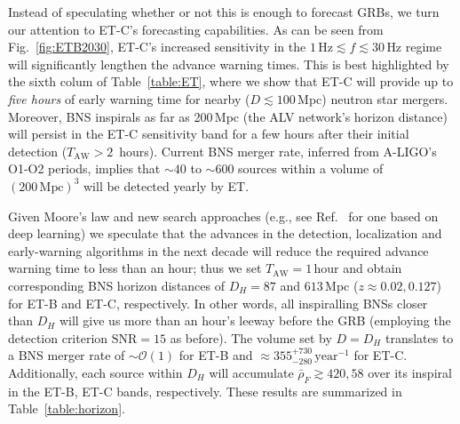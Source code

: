 \documentclass[prd,amsmath,amssymb,aps,floats,amsfonts,notitlepage,superscriptaddress,eqsecnum,nofootinbib,10pt]{revtex4-1}
\begin{document}
Instead of speculating whether or not this is enough to forecast GRBs, we turn our attention to ET-C's forecasting capabilities.
As can be seen from Fig.~\ref{fig:ETB2030}, ET-C's increased sensitivity in the $1\,\text{Hz}\lesssim f\lesssim 30\,$Hz regime will significantly lengthen the advance warning times.
This is best highlighted by the sixth colum of Table~\ref{table:ET}, 
where we show that ET-C will provide up to \emph{five hours} of early warning time for nearby ($D\lesssim 100\,$Mpc) neutron star mergers.
Moreover, BNS inspirals as far as 200\,Mpc (the ALV network's horizon distance) will persist in the ET-C sensitivity band for a few hours after their initial detection ($T_\text{AW} > 2\,$ hours).
Current BNS merger rate, inferred from A-LIGO's O1-O2 periods, implies that $\sim 40$ to $\sim600$ sources within a volume of $(200\,\text{Mpc})^3$ will be detected yearly by ET.

Given Moore's law and new search approaches (e.g., see Ref.~\cite{Gabbard:2017lja} for one based on deep learning) 
we speculate that the advances in the detection, localization and early-warning algorithms in the next decade will reduce the required advance
warning time to less than an hour; thus we set $T_\text{AW} = 1\,\text{hour}$ and obtain corresponding BNS horizon distances of $D_H=87$ and $613\,$Mpc ($z\approx 0.02,0.127$) for ET-B and ET-C, respectively.
In other words, all inspiralling BNSs closer than $D_H$ will give us more than an hour's leeway before the GRB (employing the detection criterion $\text{SNR} =15$ as before).
The volume set by $D=D_H$ translates to a BNS merger rate of $\sim\mathcal{O}(1)$ for ET-B and
$\approx 355^{+730}_{-280}\,\text{year}^{-1}$ for ET-C. Additionally, each source within $D_H$ will accumulate $\bar\rho_F \gtrsim 420, 58$ over its inspiral
in the ET-B, ET-C bands, respectively. These results are summarized in Table~\ref{table:horizon}.
\end{document}
